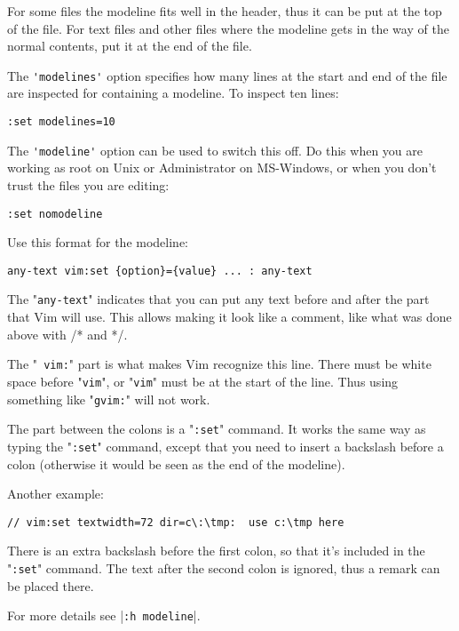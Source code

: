 For some files the modeline fits well in the header, thus it can be put at the top of the file.
For text files and other files where the modeline gets in the way of the normal contents, put it at the end of the file.

The \verb!'modelines'! option specifies how many lines at the start and end of the file are inspected for containing a modeline.
To inspect ten lines:

\begin{Verbatim}[samepage=true]
 :set modelines=10
\end{Verbatim}

The \verb!'modeline'! option can be used to switch this off.
Do this when you are working as root on Unix or Administrator on MS-Windows, or when you don't trust the files you are editing:

\begin{Verbatim}[samepage=true]
 :set nomodeline
\end{Verbatim}

Use this format for the modeline:

\begin{Verbatim}[samepage=true]
    any-text vim:set {option}={value} ... : any-text 
\end{Verbatim}

The "\verb!any-text!" indicates that you can put any text before and after the part that Vim will use.
This allows making it look like a comment, like what was done above with /* and */.

The "\verb! vim:!" part is what makes Vim recognize this line.
There must be white space before "\verb!vim!", or "\verb!vim!" must be at the start of the line.
Thus using something like "\verb!gvim:!" will not work.

The part between the colons is a "\verb!:set!" command.
It works the same way as typing the "\verb!:set!" command, except that you need to insert a backslash before a colon (otherwise it would be seen as the end of the modeline).

Another example:

\begin{Verbatim}[samepage=true]
    // vim:set textwidth=72 dir=c\:\tmp:  use c:\tmp here 
\end{Verbatim}

There is an extra backslash before the first colon, so that it's included in the "\verb!:set!" command.
The text after the second colon is ignored, thus a remark can be placed there.

For more details see |\verb!:h modeline!|.
\clearpage
